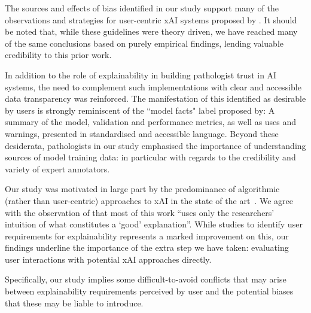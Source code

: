 The sources and effects of bias identified in our study support many of the observations and strategies for user-centric xAI systems proposed by \citet{wang_designing_2019}. It should be noted that, while these guidelines were theory driven, we have reached many of the same conclusions based on purely empirical findings, lending valuable credibility to this prior work.


In addition to the role of explainability in building pathologist trust in AI systems, the need to complement such implementations with clear and accessible data transparency was reinforced. The manifestation of this identified as desirable by users is strongly reminiscent of the ``model facts" label proposed by\cite{sendak2020presenting}: A summary of the model, validation and performance metrics, as well as uses and warnings, presented in standardised and accessible language. Beyond these desiderata, pathologists in our study emphasised the importance of understanding sources of model training data: in particular with regards to the credibility and variety of expert annotators.

Our study was motivated in large part by the predominance of algorithmic (rather than user-centric) approaches to xAI in the state of the art~\cite{tjoa_survey_2020, poceviciute_survey_2020, antoniadi2021current}. We agree with the observation of \citet{miller2019explanation} that most of this work ``uses only the researchers' intuition of what constitutes a ‘good’ explanation''. While studies to identify user requirements for explainability represents a marked improvement on this, our findings underline the importance of the extra step we have taken: evaluating user interactions with potential xAI approaches directly.

Specifically, our study implies some difficult-to-avoid conflicts that may arise between explainability requirements perceived by user and the potential biases that these may be liable to introduce.

